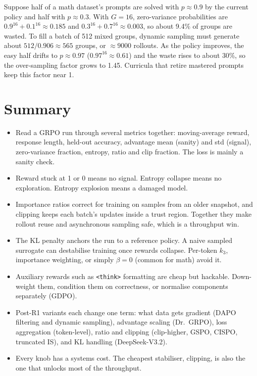 \begin{napkinmath}
Suppose half of a math dataset's prompts are solved with $p\approx0.9$ by the current policy
and half with $p\approx0.3$. With $G=16$, zero-variance probabilities are
$0.9^{16}+0.1^{16}\approx0.185$ and $0.3^{16}+0.7^{16}\approx0.003$, so about 9.4\% of groups
are wasted. To fill a batch of 512 mixed groups, dynamic sampling must generate about
$512/0.906\approx565$ groups, or $\approx\num{9000}$ rollouts. As the policy improves, the easy
half drifts to $p\approx0.97$ ($0.97^{16}\approx0.61$) and the waste rises to about 30\%, so the
over-sampling factor grows to 1.45. Curricula that retire mastered prompts keep this
factor near 1.
\end{napkinmath}

\section{Summary}\label{sec:grpo2:summary}
\begin{itemize}
\item Read a GRPO run through several metrics together: moving-average reward, response length,
held-out accuracy, advantage mean (sanity) and std (signal), zero-variance fraction, entropy,
ratio and clip fraction. The loss is mainly a sanity check.
\item Reward stuck at 1 or 0 means no signal. Entropy collapse means no exploration. Entropy
explosion means a damaged model.
\item Importance ratios correct for training on samples from an older snapshot, and clipping
keeps each batch's updates inside a trust region. Together they make rollout reuse and
asynchronous sampling safe, which is a throughput win.
\item The KL penalty anchors the run to a reference policy. A naive sampled surrogate can
destabilise training once rewards collapse. Per-token $k_3$, importance weighting, or simply
$\beta=0$ (common for math) avoid it.
\item Auxiliary rewards such as \verb|<think>| formatting are cheap but hackable. Down-weight
them, condition them on correctness, or normalise components separately (GDPO).
\item Post-R1 variants each change one term: what data gets gradient (DAPO filtering and dynamic
sampling), advantage scaling (Dr.~GRPO), loss aggregation (token-level), ratio and clipping
(clip-higher, GSPO, CISPO, truncated IS), and KL handling (DeepSeek-V3.2).
\item Every knob has a systems cost. The cheapest stabiliser, clipping, is also the one that
unlocks most of the throughput.
\end{itemize}

